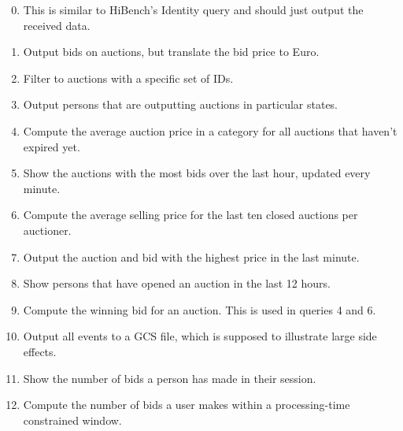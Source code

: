 \begin{enumerate}
  \setcounter{enumi}{-1}
\item {} This is similar to HiBench's Identity query and should just output the received data.
\item {} Output bids on auctions, but translate the bid price to Euro.
\item {} Filter to auctions with a specific set of IDs.
\item {} Output persons that are outputting auctions in particular states.
\item {} Compute the average auction price in a category for all auctions that haven't expired yet.
\item {} Show the auctions with the most bids over the last hour, updated every minute.
\item {} Compute the average selling price for the last ten closed auctions per auctioner.
\item {} Output the auction and bid with the highest price in the last minute.
\item {} Show persons that have opened an auction in the last 12 hours.
\item {} Compute the winning bid for an auction. This is used in queries 4 and 6.
\item {} Output all events to a GCS file, which is supposed to illustrate large side effects.
\item {} Show the number of bids a person has made in their session.
\item {} Compute the number of bids a user makes within a processing-time constrained window.
\end{enumerate}

